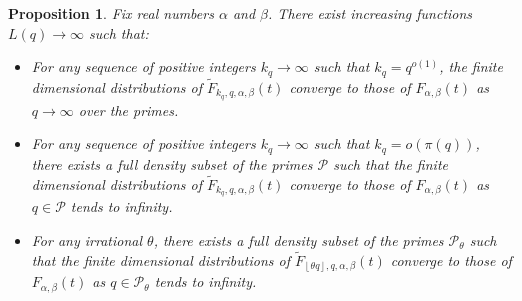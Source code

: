 \documentclass[12pt, a4paper]{amsart}
\newtheorem{proposition}{Proposition}
\theoremstyle{remark}
\newcommand{\floor}[1]{\left\lfloor#1\right\rfloor}
\newcommand{\cP}{\mathcal{P}}
\begin{document}
\begin{proposition} \label{prop:chi-moments2}
    Fix real numbers $\alpha$ and $\beta$. There exist increasing functions $L(q)\to\infty$ such that: 
\begin{itemize}
    \item[(1)] For any sequence of positive integers $k_q\to\infty$ such that
        $k_q = q^{o(1)}$, the finite dimensional distributions of $\tilde
        F_{k_q, q, \alpha, \beta}(t)$ converge to those of $F_{\alpha,
        \beta}(t)$ as $q\to\infty$ over the primes.
    \item[(2)] For any sequence of positive integers $k_q\to\infty$ such that
        $k_q = o(\pi(q))$, there exists a full density subset of the primes $\cP$
        such that the finite dimensional distributions of $\tilde F_{k_q, q,
        \alpha, \beta}(t)$ converge to those of $F_{\alpha, \beta}(t)$ as $q\in\cP$ tends to infinity. 
    \item[(3)] For any irrational $\theta$, there exists a full density subset
        of the primes $\cP_\theta$ such that the finite dimensional distributions
        of $\tilde F_{\floor{\theta q}, q, \alpha, \beta}(t)$ converge to those
        of $F_{\alpha,\beta}(t)$ as $q \in \cP_\theta$ tends to infinity.
\end{itemize}
\end{proposition}
\end{document}
